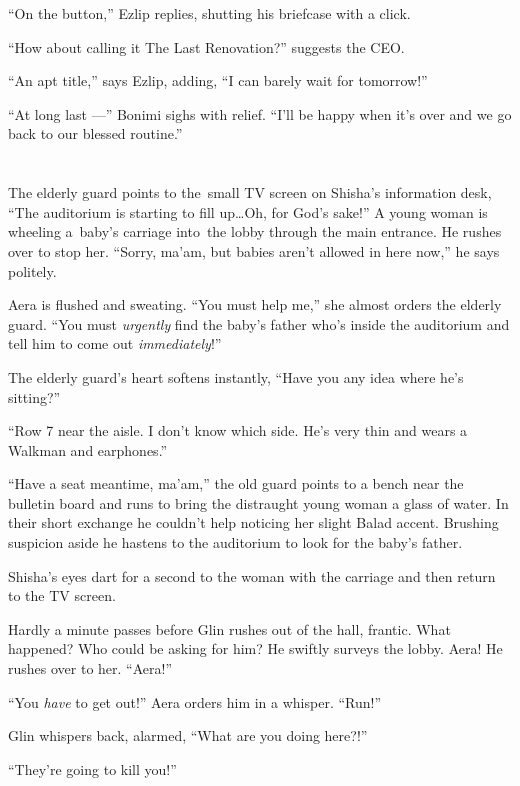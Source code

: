 \documentclass[twoside,11pt]{book}
\begin{document}
``On the button,'' Ezlip replies, shutting his briefcase with a click.

``How about calling it The Last Renovation?'' suggests the CEO.

``An apt title,'' says Ezlip, adding, ``I can barely wait for
tomorrow!''

``At long last ---'' Bonimi sighs with relief. ``I'll be happy when it's over and
we go back to our blessed routine.''


\chapter{}

The elderly guard points to the~small TV screen on Shisha's information desk, ``The auditorium is starting
to fill up{\ldots}Oh, for God's sake!'' A young woman is wheeling a~baby's carriage into~the lobby
through the main entrance. He rushes over to stop her. ``Sorry,
ma'am, but babies aren't allowed in here now,'' he says politely.

Aera is flushed and sweating. ``You must help me,'' she almost orders the elderly guard.
``You must \textit{urgently} find the baby's father who's inside the auditorium and tell him to come out
\textit{immediately}!''

The elderly guard's heart softens instantly, ``Have you any idea where he's sitting?''

``Row 7 near the aisle. I don't know which side. He's very thin and wears a Walkman and
earphones.''

``Have a seat meantime, ma'am,'' the old guard points to a bench near the bulletin board and runs to bring
the distraught young woman a glass of water. In their short exchange he couldn't help noticing her slight Balad accent.
Brushing suspicion aside he hastens to the auditorium to look for the baby's father.

Shisha's eyes dart for a second to the woman with{ }the carriage and then
return to the TV screen.

Hardly a minute passes before Glin rushes out of the hall, frantic. What happened? Who could be asking for him? He
swiftly surveys the lobby. Aera! He rushes over to her. ``Aera!''

``You \textit{have} to get out!'' Aera orders him in a whisper.
``Run!''

Glin whispers back, alarmed{, }{}``What are you doing here?!''

``They're going to kill you!''
\end{document}
